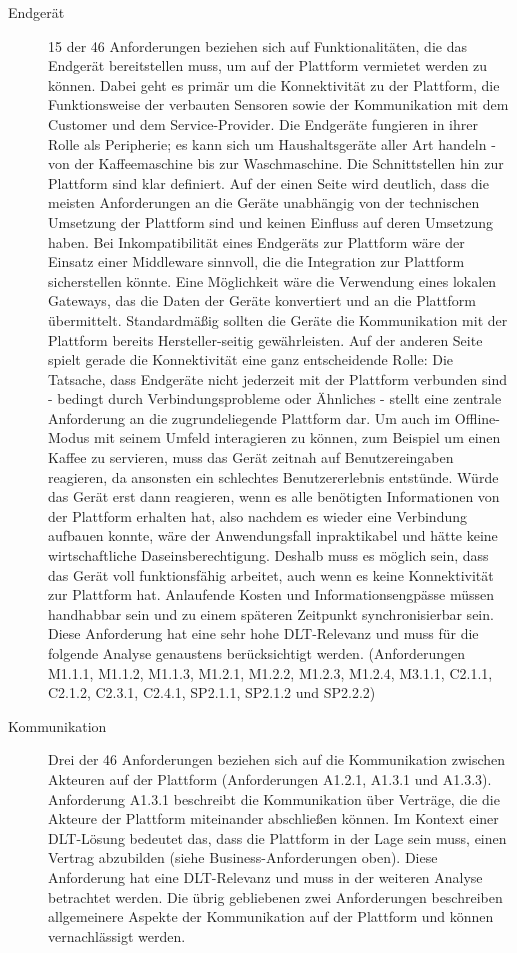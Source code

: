 \begin{description}
  \item[Endgerät] 15 der 46 Anforderungen beziehen sich auf Funktionalitäten, die das Endgerät bereitstellen muss, um auf der Plattform vermietet werden zu können. Dabei geht es primär um die Konnektivität zu der Plattform, die Funktionsweise der verbauten Sensoren sowie der Kommunikation mit dem Customer und dem Service-Provider. Die Endgeräte fungieren in ihrer Rolle als Peripherie; es kann sich um Haushaltsgeräte aller Art handeln - von der Kaffeemaschine bis zur Waschmaschine. Die Schnittstellen hin zur Plattform sind klar definiert. Auf der einen Seite wird deutlich, dass die meisten Anforderungen an die Geräte unabhängig von der technischen Umsetzung der Plattform sind und keinen Einfluss auf deren Umsetzung haben. Bei Inkompatibilität eines Endgeräts zur Plattform wäre der Einsatz einer Middleware sinnvoll, die die Integration zur Plattform sicherstellen könnte. Eine Möglichkeit wäre die Verwendung eines lokalen Gateways, das die Daten der Geräte konvertiert und an die Plattform übermittelt. Standardmäßig sollten die Geräte die Kommunikation mit der Plattform bereits Hersteller-seitig gewährleisten. Auf der anderen Seite spielt gerade die Konnektivität eine ganz entscheidende Rolle: Die Tatsache, dass Endgeräte nicht jederzeit mit der Plattform verbunden sind - bedingt durch Verbindungsprobleme oder Ähnliches - stellt eine zentrale Anforderung an die zugrundeliegende Plattform dar. Um auch im Offline-Modus mit seinem Umfeld interagieren zu können, zum Beispiel um einen Kaffee zu servieren, muss das Gerät zeitnah auf Benutzereingaben reagieren, da ansonsten ein schlechtes Benutzererlebnis entstünde. Würde das Gerät erst dann reagieren, wenn es alle benötigten Informationen von der Plattform erhalten hat, also nachdem es wieder eine Verbindung aufbauen konnte, wäre der Anwendungsfall inpraktikabel und hätte keine wirtschaftliche Daseinsberechtigung. Deshalb muss es möglich sein, dass das Gerät voll funktionsfähig arbeitet, auch wenn es keine Konnektivität zur Plattform hat. Anlaufende Kosten und Informationsengpässe müssen handhabbar sein und zu einem späteren Zeitpunkt synchronisierbar sein. Diese Anforderung hat eine sehr hohe \ac{DLT}-Relevanz und muss für die folgende Analyse genaustens berücksichtigt werden. (Anforderungen M1.1.1, M1.1.2, M1.1.3, M1.2.1, M1.2.2, M1.2.3, M1.2.4, M3.1.1, C2.1.1, C2.1.2, C2.3.1, C2.4.1, SP2.1.1, SP2.1.2 und SP2.2.2)
  \item[Kommunikation] Drei der 46 Anforderungen beziehen sich auf die Kommunikation zwischen Akteuren auf der Plattform (Anforderungen A1.2.1, A1.3.1 und A1.3.3). Anforderung A1.3.1 beschreibt die Kommunikation über Verträge, die die Akteure der Plattform miteinander abschließen können. Im Kontext einer \ac{DLT}-Lösung bedeutet das, dass die Plattform in der Lage sein muss, einen Vertrag abzubilden (siehe Business-Anforderungen oben). Diese Anforderung hat eine \ac{DLT}-Relevanz und muss in der weiteren Analyse betrachtet werden. Die übrig gebliebenen zwei Anforderungen beschreiben allgemeinere Aspekte der Kommunikation auf der Plattform und können vernachlässigt werden.

\end{description}
